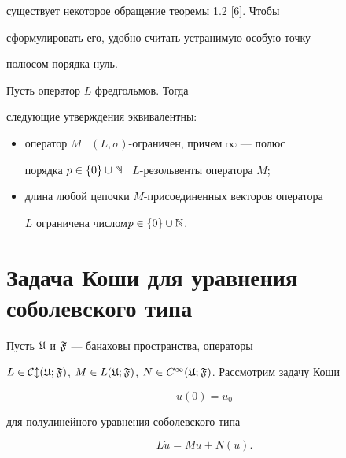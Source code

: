 существует некоторое обращение теоремы 1.2 [6]. Чтобы


сформулировать его, удобно считать устранимую особую точку


полюсом порядка нуль.








\begin{cors}


Пусть оператор $L$ фредгольмов. Тогда


следующие утверждения эквивалентны:


\begin{itemize}


\item[(i)] оператор $M$ \ $(L,\sigma)$-ограничен, причем $\infty$ --- полюс


порядка $p\in\{0\}\cup\Bbb N$ \ $L$-резольвенты оператора $M$;


\item[(ii)] длина любой цепочки $M$-присоединенных векторов оператора


$L$ ограничена числом\linebreak $p\in\{0\}\cup\Bbb N$.


\end{itemize}


\end{cors}








\section{Задача Коши для уравнения соболевского типа}





Пусть $\frak U$ и $\frak F$ --- банаховы пространства, операторы


$L\in \Cl(\frak U;\frak F)$, $M\in L(\frak U;\frak F)$, $N\in


C^{\infty}(\frak U;\frak F)$. Рассмотрим задачу Коши


\begin{equation}


u(0)=u_{0}


\end{equation}


для полулинейного уравнения соболевского типа


\begin{equation}


L\Dot{u}=Mu+N(u).


\end{equation}


